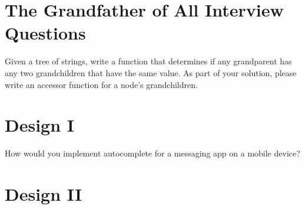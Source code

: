 \documentclass[12pt,runningheads]{article}
\begin{document}
\begin{comment}
This can be reduced to a power-set problem.

Theoretically, generate all n-length bit-strings, where n is the length of the argument string.
For each bit at i in each string, if a bit i is 0, then, use the ith letter of the string there.
Otherwise, it bit i is 1, then it is number (adjacent 1's are added together).

Realistically, this involves a divide-and-conquer approach (trim each letter) and a lot of int <=> str conversions.

Haskell solution:
https://gist.github.com/LOZORD/eb7792aa6182624a28a2
\end{comment}

\newpage

\section{The Grandfather of All Interview Questions}

Given a tree of strings, write a function that determines if any grandparent has any two grandchildren that have the same value. As part of your solution, please write an accessor function for a node's grandchildren.
\begin{comment}
Interviewee should ask about how tree is implemented (BST, binary, etc.).
Depending upon implementation, this question should be trivial.

Basically:

gchildren = node.getGrandchildren() # implemented by interviewee
uniqGChildren = gchildren.uniqBy {node a, node b: a.data == b.data} # remove duplicates
return gchildren != uniqGChidren # we removed at least one duplicate
\end{comment}
\newpage

\section{Design I}

How would you implement autocomplete for a messaging app on a mobile device?
\begin{comment}
Although a map or a set is good starting point, the best implementation is a trie (not tree).
This is memory efficient, and also works well with user's typings.
\end{comment}
\newpage

\section{Design II}
\end{document}
